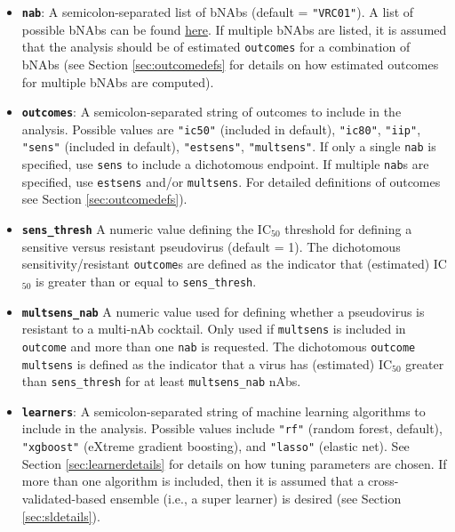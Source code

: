\documentclass[]{article}
\providecommand{\tightlist}{%
  \setlength{\itemsep}{0pt}\setlength{\parskip}{0pt}}
\begin{document}
\begin{itemize}
\tightlist
\item
  \textbf{\texttt{nab}}: A semicolon-separated list of bNAbs (default =
  \texttt{"VRC01"}). A list of possible bNAbs can be found
  \href{https://www.hiv.lanl.gov/components/sequence/HIV/neutralization/main.comp}{here}.
  If multiple bNAbs are listed, it is assumed that the analysis should
  be of estimated \texttt{outcomes} for a combination of bNAbs (see
  Section \ref{sec:outcomedefs} for details on how estimated outcomes
  for multiple bNAbs are computed).
\item
  \textbf{\texttt{outcomes}}: A semicolon-separated string of outcomes
  to include in the analysis. Possible values are \texttt{"ic50"}
  (included in default), \texttt{"ic80"}, \texttt{"iip"},
  \texttt{"sens"} (included in default), \texttt{"estsens"},
  \texttt{"multsens"}. If only a single \texttt{nab} is specified, use
  \texttt{sens} to include a dichotomous endpoint. If multiple
  \texttt{nab}s are specified, use \texttt{estsens} and/or
  \texttt{multsens}. For detailed definitions of outcomes see Section
  \ref{sec:outcomedefs}).
\item
  \textbf{\texttt{sens\_thresh}} A numeric value defining the
  IC\(_{50}\) threshold for defining a sensitive versus resistant
  pseudovirus (default = 1). The dichotomous sensitivity/resistant
  \texttt{outcome}s are defined as the indicator that (estimated)
  IC\(_{50}\) is greater than or equal to \texttt{sens\_thresh}.
\item
  \textbf{\texttt{multsens\_nab}} A numeric value used for defining
  whether a pseudovirus is resistant to a multi-nAb cocktail. Only used
  if \texttt{multsens} is included in \texttt{outcome} and more than one
  \texttt{nab} is requested. The dichotomous \texttt{outcome}
  \texttt{multsens} is defined as the indicator that a virus has
  (estimated) IC\(_{50}\) greater than \texttt{sens\_thresh} for at
  least \texttt{multsens\_nab} nAbs.
\item
  \textbf{\texttt{learners}}: A semicolon-separated string of machine
  learning algorithms to include in the analysis. Possible values
  include \texttt{"rf"} (random forest, default), \texttt{"xgboost"}
  (eXtreme gradient boosting), and \texttt{"lasso"} (elastic net). See
  Section \ref{sec:learnerdetails} for details on how tuning parameters
  are chosen. If more than one algorithm is included, then it is assumed
  that a cross-validated-based ensemble (i.e., a super learner) is
  desired (see Section \ref{sec:sldetails}).

\end{itemize}
\end{document}
